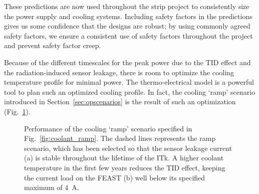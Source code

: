 These predictions are now used throughout the strip project to consistently size the power supply and cooling systems. Including safety factors in the predictions gives us some confidence that the designs are robust; by using commonly agreed safety factors, we ensure a consistent use of safety factors throughout the project and prevent safety factor creep.

Because of the different timescales for the peak power due to the TID effect and the radiation-induced sensor leakage, there is room to optimize the cooling temperature profile for minimal power. The thermo-electrical model is a powerful tool to plan such an optimized cooling profile. In fact, the cooling `ramp' scenario introduced in Section~\ref{sec:opscenarios} is the result of such an optimization (Fig.~\ref{fig:rampoptimization}).

\begin{figure}[ht]
\centering
{}\quad\quad
{}
\caption{Performance of the cooling `ramp' scenario specified in Fig.~\ref{fig:coolant_ramp}. The dashed lines represents the ramp scenario, which has been selected so that the sensor leakage current (a) is stable throughout the lifetime of the ITk. A higher coolant temperature in the first few years reduces the TID effect, keeping the current load on the FEAST (b) well below its specified maximum of 4~A.}
\label{fig:rampoptimization}
\end{figure}
